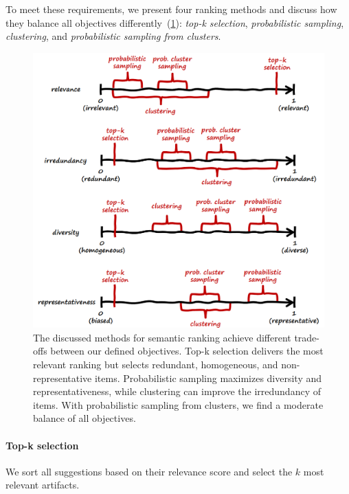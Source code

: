 \noindent
To meet these requirements, we present four ranking methods and discuss how they balance all objectives differently~(\cref{fig:suggestions/ranking/method_objectives}): \emph{top-k selection}, \emph{probabilistic sampling}, \emph{clustering}, and \emph{probabilistic sampling from clusters}.

\begin{figure}
	\centering
	\includegraphics[width=\textwidth]{03_ranking/method_objectives.png}
	\caption[Different methods for semantic ranking achieve different trade-offs between our defined objectives.]{
		The discussed methods for semantic ranking achieve different trade-offs between our defined objectives.
		Top-k selection delivers the most relevant ranking but selects redundant, homogeneous, and non-representative items.
		Probabilistic sampling maximizes diversity and representativeness, while clustering can improve the irredundancy of items.
		With probabilistic sampling from clusters, we find a moderate balance of all objectives.
	}
	\label{fig:suggestions/ranking/method_objectives}
\end{figure}

\paragraph{Top-k selection}
We sort all suggestions based on their relevance score and select the $k$ most relevant artifacts.

